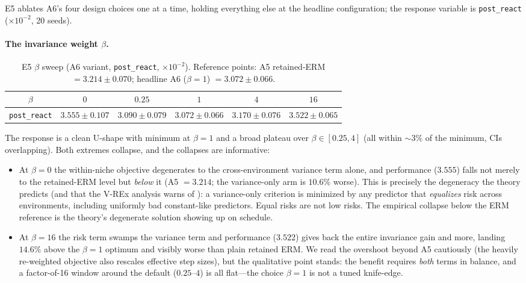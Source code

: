 \documentclass[11pt,a4paper]{article}
\theoremstyle{definition}
\theoremstyle{plain}
\begin{document}
E5 ablates A6's four design choices one at a time, holding everything else
at the headline configuration; the response variable is
\texttt{post\_react} ($\times 10^{-2}$, 20 seeds).

\paragraph{The invariance weight $\beta$.}

\begin{table}[h]
\centering
\caption{E5 $\beta$ sweep (A6 variant, \texttt{post\_react},
$\times 10^{-2}$). Reference points: A5 retained-ERM $= 3.214 \pm 0.070$;
headline A6 ($\beta = 1$) $= 3.072 \pm 0.066$.}
\label{tab:dd5-e5-beta}
\small
\begin{tabular}{cccccc}
\toprule
$\beta$ & $0$ & $0.25$ & $1$ & $4$ & $16$ \\
\midrule
\texttt{post\_react} & $3.555 \pm 0.107$ & $3.090 \pm 0.079$ &
$3.072 \pm 0.066$ & $3.170 \pm 0.076$ & $3.522 \pm 0.065$ \\
\bottomrule
\end{tabular}
\end{table}

The response is a clean U-shape with minimum at $\beta = 1$ and a broad
plateau over $\beta \in [0.25, 4]$ (all within $\sim 3\%$ of the minimum,
CIs overlapping). Both extremes collapse, and the collapses are
informative:
\begin{itemize}
\item At $\beta = 0$ the within-niche objective degenerates to the
cross-environment variance term alone, and performance ($3.555$) falls not
merely to the retained-ERM level but \emph{below} it
(A5 $= 3.214$; the variance-only arm is $10.6\%$ worse). This is precisely
the degeneracy the theory predicts (and that the V-REx analysis warns of
\citep{krueger2021rex}): a variance-only criterion is minimized by any
predictor that \emph{equalizes} risk across environments, including
uniformly bad constant-like predictors. Equal risks are not low risks. The
empirical collapse below the ERM reference is the theory's degenerate
solution showing up on schedule.
\item At $\beta = 16$ the risk term swamps the variance term and
performance ($3.522$) gives back the entire invariance gain and more,
landing $14.6\%$ above the $\beta = 1$ optimum and visibly worse than plain
retained ERM. We read the overshoot beyond A5 cautiously (the heavily
re-weighted objective also rescales effective step sizes), but the
qualitative point stands: the benefit requires \emph{both} terms in
balance, and a factor-of-16 window around the default ($0.25$--$4$) is all
flat---the choice $\beta = 1$ is not a tuned knife-edge.
\end{itemize}
\end{document}
